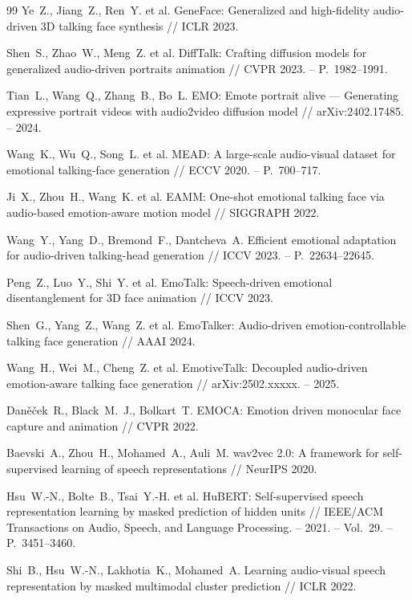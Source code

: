 \documentclass[a4paper, 12pt, oneside, openany]{article}
\begin{document}
\begin{thebibliography}{99}
Ye~Z., Jiang~Z., Ren~Y. et al. GeneFace: Generalized and high-fidelity audio-driven 3D talking face synthesis // ICLR 2023.

Shen~S., Zhao~W., Meng~Z. et al. DiffTalk: Crafting diffusion models for generalized audio-driven portraits animation // CVPR 2023. -- P.~1982--1991.

Tian~L., Wang~Q., Zhang~B., Bo~L. EMO: Emote portrait alive --- Generating expressive portrait videos with audio2video diffusion model // arXiv:2402.17485. -- 2024.

Wang~K., Wu~Q., Song~L. et al. MEAD: A large-scale audio-visual dataset for emotional talking-face generation // ECCV 2020. -- P.~700--717.

Ji~X., Zhou~H., Wang~K. et al. EAMM: One-shot emotional talking face via audio-based emotion-aware motion model // SIGGRAPH 2022.

Wang~Y., Yang~D., Bremond~F., Dantcheva~A. Efficient emotional adaptation for audio-driven talking-head generation // ICCV 2023. -- P.~22634--22645.

Peng~Z., Luo~Y., Shi~Y. et al. EmoTalk: Speech-driven emotional disentanglement for 3D face animation // ICCV 2023.

Shen~G., Yang~Z., Wang~Z. et al. EmoTalker: Audio-driven emotion-controllable talking face generation // AAAI 2024.

Wang~H., Wei~M., Cheng~Z. et al. EmotiveTalk: Decoupled audio-driven emotion-aware talking face generation // arXiv:2502.xxxxx. -- 2025.

Daněček~R., Black~M.~J., Bolkart~T. EMOCA: Emotion driven monocular face capture and animation // CVPR 2022.

Baevski~A., Zhou~H., Mohamed~A., Auli~M. wav2vec 2.0: A framework for self-supervised learning of speech representations // NeurIPS 2020.

Hsu~W.-N., Bolte~B., Tsai~Y.-H. et al. HuBERT: Self-supervised speech representation learning by masked prediction of hidden units // IEEE/ACM Transactions on Audio, Speech, and Language Processing. -- 2021. -- Vol.~29. -- P.~3451--3460.

Shi~B., Hsu~W.-N., Lakhotia~K., Mohamed~A. Learning audio-visual speech representation by masked multimodal cluster prediction // ICLR 2022.


\end{thebibliography}
\end{document}

